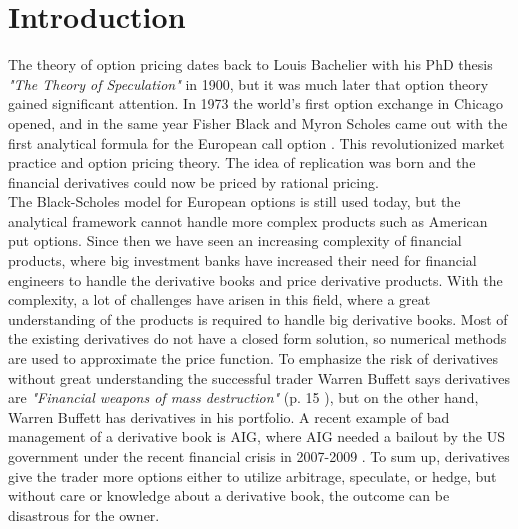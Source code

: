 
\chapter{Introduction} %

\label{Chapter1} %

The theory of option pricing dates back to Louis Bachelier with his PhD thesis \textsl{"The Theory of Speculation"} in 1900, but it was much later that option theory gained significant attention. In 1973 the world's first option exchange in Chicago opened, and in the same year Fisher Black and Myron Scholes came out with the first analytical formula for the European call option \parencite{B-S-Paper}. This revolutionized market practice and option pricing theory. The idea of replication was born and the financial derivatives could now be priced by rational pricing. \\

The Black-Scholes model for European options is still used today, but the analytical framework cannot handle more complex products such as American put options. Since then we have seen an increasing complexity of financial products, where big investment banks have increased their need for financial engineers to handle the derivative books and price derivative products. With the complexity, a lot of challenges have arisen in this field, where a great understanding of the products is required to handle big derivative books. Most of the existing derivatives do not have a closed form solution, so numerical methods are used to approximate the price function. To emphasize the risk of derivatives without great understanding the successful trader Warren Buffett says derivatives are \textsl{"Financial weapons of mass destruction"} (p. 15 \parencite{Buffett02}), but on the other hand, Warren Buffett has derivatives in his portfolio. A recent example of bad management of a derivative book is AIG, where AIG needed a bailout by the US government under the recent financial crisis in  2007-2009 \parencite{McDonaldRobert2015}. To sum up, derivatives give the trader more options either to utilize arbitrage, speculate, or hedge, but without care or knowledge about a derivative book, the outcome can be disastrous for the owner.\\

